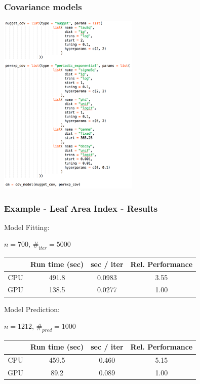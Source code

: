 \documentclass[slidestop,mathserif]{beamer}
\begin{document}

\begin{frame}
\frametitle{Covariance models}

\vspace{-5mm}

\begin{center}
\includegraphics[width=0.5\textwidth]{figs/cov_model.png}
\end{center}

\end{frame}


\begin{frame}
\frametitle{Example - Leaf Area Index - Results}

Model Fitting: 
\vspace{-2mm}
\begin{center}
$n = 700$, $\#_{iter} = 5000$

\vspace{4mm}

\begin{tabular}{c|cc|c}
    & Run time (sec) & sec / iter & Rel. Performance \\
\hline
CPU & 491.8          & 0.0983     & 3.55 \\
GPU & 138.5          & 0.0277     & 1.00 \\
\hline
\end{tabular}
\end{center}

\vspace{7mm}

Model Prediction: 
\vspace{-2mm}
\begin{center}
$n = 1212$, $\#_{pred} = 1000$

\vspace{4mm}

\begin{tabular}{c|cc|c}
    & Run time (sec) & sec / iter & Rel. Performance \\
\hline
CPU & 459.5          & 0.460      & 5.15 \\
GPU &  89.2          & 0.089      & 1.00 \\
\hline
\end{tabular}
\end{center}

\end{frame}
\end{document}
